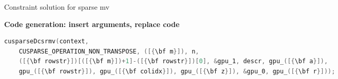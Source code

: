 \caption{Constraint solution for sparse mv}
\label{fig:spmvexample2}

\centering
\vspace{0.0em}
{\centering
\begin{minipage}{0.05\linewidth}
\vspace{0pt}
\centering
{}
\end{minipage}
\begin{minipage}{\linewidth}
\centering
\textbf{Code generation: insert arguments, replace code}
\end{minipage}
\begin{minipage}{0.05\linewidth}
\vspace{0pt}
\centering
{}
\end{minipage}
}


\begin{lstlisting}[language=C, basicstyle=\linespread{0.75}\small\ttfamily,
                   label={fig:spmvexample3}, caption={Generated function call to cuSPARSE}]
cusparseDcsrmv(context,
    CUSPARSE_OPERATION_NON_TRANSPOSE, ([{\bf m}]), n,
    ([{\bf rowstr}])[([{\bf m}])+1]-([{\bf rowstr}])[0], &gpu_1, descr, gpu_([{\bf a}]),
    gpu_([{\bf rowstr}]), gpu_([{\bf colidx}]), gpu_([{\bf z}]), &gpu_0, gpu_([{\bf r}]));
\end{lstlisting}
\vspace{-0.287cm}